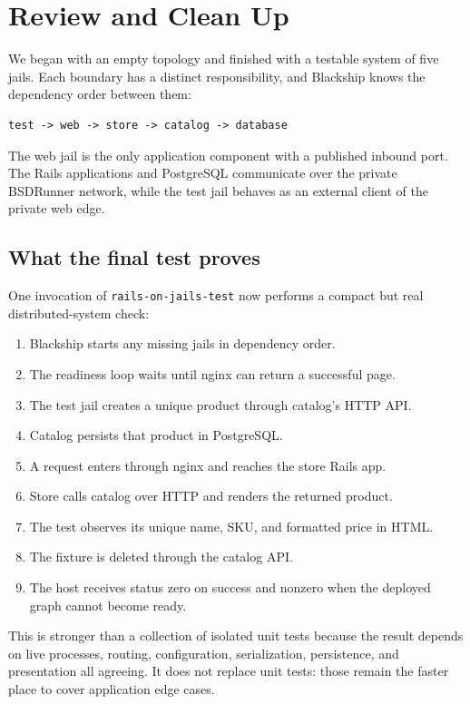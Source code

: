 \chapter{Review and Clean Up}

We began with an empty topology and finished with a testable system of five
jails. Each boundary has a distinct responsibility, and Blackship knows the
dependency order between them:

\begin{lstlisting}
test -> web -> store -> catalog -> database
\end{lstlisting}

The web jail is the only application component with a published inbound port.
The Rails applications and PostgreSQL communicate over the private BSDRunner
network, while the test jail behaves as an external client of the private web
edge.

\section{What the final test proves}

One invocation of \texttt{rails-on-jails-test} now performs a compact but real
distributed-system check:

\begin{enumerate}
  \item Blackship starts any missing jails in dependency order.
  \item The readiness loop waits until nginx can return a successful page.
  \item The test jail creates a unique product through catalog's HTTP API.
  \item Catalog persists that product in PostgreSQL.
  \item A request enters through nginx and reaches the store Rails app.
  \item Store calls catalog over HTTP and renders the returned product.
  \item The test observes its unique name, SKU, and formatted price in HTML.
  \item The fixture is deleted through the catalog API.
  \item The host receives status zero on success and nonzero when the deployed
    graph cannot become ready.
\end{enumerate}

This is stronger than a collection of isolated unit tests because the result
depends on live processes, routing, configuration, serialization, persistence,
and presentation all agreeing. It does not replace unit tests: those remain
the faster place to cover application edge cases.

